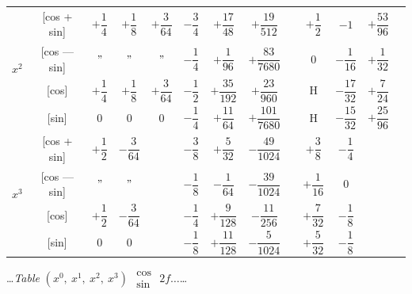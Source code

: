 \documentclass[10pt,a4paper]{article}
\newcommand{\tabletitle}[2]{%
  \begin{center}
  \ldots\textit{Table} #1 $\displaystyle\begin{smallmatrix} \cos \\ \sin \end{smallmatrix}$ #2\ldots
  \end{center}
}
\begin{document}
\begin{center}
\begin{tabular}{|c|c|c|c|c|c|c|c|c|c|c|c|c|}
\hline
\multirow{4}{*}{$x^2$} & [cos + sin] & $+\dfrac{1}{4}$ & $+\dfrac{1}{8}$ & $+\dfrac{3}{64}$ & $-\dfrac{3}{4}$ & $+\dfrac{17}{48}$ & $+\dfrac{19}{512}$ & & $+\dfrac{1}{2}$ & $-1$ & $+\dfrac{53}{96}$ \\
& [cos --- sin] & $"$ & $"$ & $"$ & $-\dfrac{1}{4}$ & $+\dfrac{1}{96}$ & $+\dfrac{83}{7680}$ & & $0$ & $-\dfrac{1}{16}$ & $+\dfrac{1}{32}$ \\
& [cos] & $+\dfrac{1}{4}$ & $+\dfrac{1}{8}$ & $+\dfrac{3}{64}$ & $-\dfrac{1}{2}$ & $+\dfrac{35}{192}$ & $+\dfrac{23}{960}$ & & H & $-\dfrac{17}{32}$ & $+\dfrac{7}{24}$ \\
& [sin] & $0$ & $0$ & $0$ & $-\dfrac{1}{4}$ & $+\dfrac{11}{64}$ & $+\dfrac{101}{7680}$ & & H & $-\dfrac{15}{32}$ & $+\dfrac{25}{96}$ \\
\hline
\multirow{4}{*}{$x^3$} & [cos + sin] & $+\dfrac{1}{2}$ & $-\dfrac{3}{64}$ & & $-\dfrac{3}{8}$ & $+\dfrac{5}{32}$ & $-\dfrac{49}{1024}$ & & $+\dfrac{3}{8}$ & $-\dfrac{1}{4}$ \\
& [cos --- sin] & $"$ & $"$ & & $-\dfrac{1}{8}$ & $-\dfrac{1}{64}$ & $-\dfrac{39}{1024}$ & & $+\dfrac{1}{16}$ & $0$ \\
& [cos] & $+\dfrac{1}{2}$ & $-\dfrac{3}{64}$ & & $-\dfrac{1}{4}$ & $+\dfrac{9}{128}$ & $-\dfrac{11}{256}$ & & $+\dfrac{7}{32}$ & $-\dfrac{1}{8}$ \\
& [sin] & $0$ & $0$ & & $-\dfrac{1}{8}$ & $+\dfrac{11}{128}$ & $-\dfrac{5}{1024}$ & & $+\dfrac{5}{32}$ & $-\dfrac{1}{8}$ \\
\hline
\end{tabular}
\end{center}

\newpage

\tabletitle{$(x^0,\ x^1,\ x^2,\ x^3)$}{$2f\ldots$}
\end{document}

